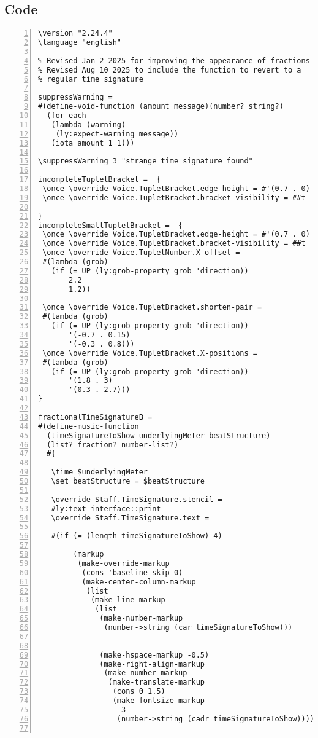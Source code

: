 \subsection{Code}
\begin{Verbatim}[numbers=left,xleftmargin=5mm]
\version "2.24.4"
\language "english"

% Revised Jan 2 2025 for improving the appearance of fractions
% Revised Aug 10 2025 to include the function to revert to a
% regular time signature

suppressWarning =
#(define-void-function (amount message)(number? string?)
  (for-each
   (lambda (warning)
    (ly:expect-warning message))
   (iota amount 1 1)))

\suppressWarning 3 "strange time signature found"

incompleteTupletBracket =  {
 \once \override Voice.TupletBracket.edge-height = #'(0.7 . 0)
 \once \override Voice.TupletBracket.bracket-visibility = ##t

}
incompleteSmallTupletBracket =  {
 \once \override Voice.TupletBracket.edge-height = #'(0.7 . 0)
 \once \override Voice.TupletBracket.bracket-visibility = ##t
 \once \override Voice.TupletNumber.X-offset =
 #(lambda (grob)
   (if (= UP (ly:grob-property grob 'direction))
       2.2
       1.2))

 \once \override Voice.TupletBracket.shorten-pair =
 #(lambda (grob)
   (if (= UP (ly:grob-property grob 'direction))
       '(-0.7 . 0.15)
       '(-0.3 . 0.8)))
 \once \override Voice.TupletBracket.X-positions =
 #(lambda (grob)
   (if (= UP (ly:grob-property grob 'direction))
       '(1.8 . 3)
       '(0.3 . 2.7)))
}

fractionalTimeSignatureB =
#(define-music-function
  (timeSignatureToShow underlyingMeter beatStructure)
  (list? fraction? number-list?)
  #{

   \time $underlyingMeter
   \set beatStructure = $beatStructure

   \override Staff.TimeSignature.stencil =
   #ly:text-interface::print
   \override Staff.TimeSignature.text =

   #(if (= (length timeSignatureToShow) 4)

        (markup
         (make-override-markup
          (cons 'baseline-skip 0)
          (make-center-column-markup
           (list
            (make-line-markup
             (list
              (make-number-markup
               (number->string (car timeSignatureToShow)))


              (make-hspace-markup -0.5)
              (make-right-align-markup
               (make-number-markup
                (make-translate-markup
                 (cons 0 1.5)
                 (make-fontsize-markup
                  -3
                  (number->string (cadr timeSignatureToShow))))))


\end{Verbatim}
